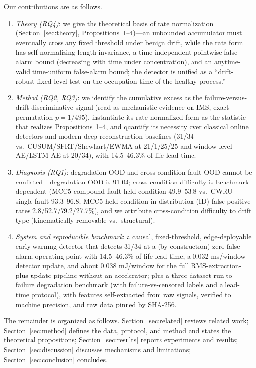 \documentclass[journal]{IEEEtran}
\begin{document}
Our contributions are as follows.
\begin{enumerate}
\item \emph{Theory (RQ4)}: we give the theoretical basis of rate normalization (Section~\ref{sec:theory}, Propositions~1--4)---an unbounded accumulator must eventually cross any fixed threshold under benign drift, while the rate form has self-normalizing length invariance, a time-independent pointwise false-alarm bound (decreasing with time under concentration), and an anytime-valid time-uniform false-alarm bound; the detector is unified as a ``drift-robust fixed-level test on the occupation time of the healthy process.''
\item \emph{Method (RQ2, RQ3)}: we identify the cumulative excess as the failure-versus-drift discriminative signal (read as mechanistic evidence on IMS, exact permutation $p=1/495$), instantiate its rate-normalized form as the statistic that realizes Propositions~1--4, and quantify its necessity over classical online detectors and modern deep reconstruction baselines (31/34 vs.\ CUSUM/SPRT/Shewhart/EWMA at 21/1/25/25 and window-level AE/LSTM-AE at 20/34), with 14.5--46.3\%-of-life lead time.
\item \emph{Diagnosis (RQ1)}: degradation OOD and cross-condition fault OOD cannot be conflated---degradation OOD is 91.04; cross-condition difficulty is benchmark-dependent (MCC5 compound-fault held-condition 49.9--53.8 vs.\ CWRU single-fault 93.3--96.8; MCC5 held-condition in-distribution (ID) false-positive rates 2.8/52.7/79.2/27.7\%), and we attribute cross-condition difficulty to drift type (kinematically removable vs.\ structural).
\item \emph{System and reproducible benchmark}: a causal, fixed-threshold, edge-deployable early-warning detector that detects 31/34 at a (by-construction) zero-false-alarm operating point with 14.5--46.3\%-of-life lead time, a 0.032 ms/window detector update, and about 0.038 mJ/window for the full RMS-extraction-plus-update pipeline without an accelerator; plus a three-dataset run-to-failure degradation benchmark (with failure-vs-censored labels and a lead-time protocol), with features self-extracted from raw signals, verified to machine precision, and raw data pinned by SHA-256.
\end{enumerate}

The remainder is organized as follows. Section~\ref{sec:related} reviews related work; Section~\ref{sec:method} defines the data, protocol, and method and states the theoretical propositions; Section~\ref{sec:results} reports experiments and results; Section~\ref{sec:discussion} discusses mechanisms and limitations; Section~\ref{sec:conclusion} concludes.
\end{document}
